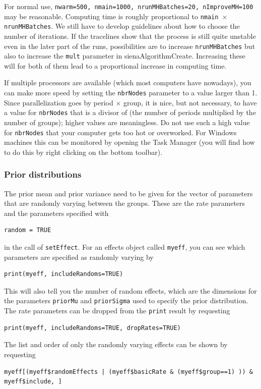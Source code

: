\documentclass[a4paper,fleqn,11pt]{article}
\newcommand{\+}{\, + \,}
\newcommand{\sfn}[1]{\textsf{#1}}
\begin{document}
For normal use, \texttt{nwarm=500, nmain=1000, nrunMHBatches=20, nImproveMH=100}
may be reasonable.
Computing time is roughly proportional to
\texttt{nmain $\times$ nrunMHBatches}.
We still have to develop guidelines about how to choose the number of
iterations. If the tracelines show that the process is still quite
unstable even in the later part of the runs, possibilities are to
increase \texttt{nrunMHBatches} but also to increase the \texttt{mult} parameter in
\sfn{sienaAlgorithmCreate}. Increasing these will for both of them lead to
a proportional increase in computing time.

If multiple processors are available (which most computers have nowadays),
you can make more speed by setting the \texttt{nbrNodes} parameter to a value
larger than 1. Since parallelization goes by period $\times$ group,
it is nice, but not necessary, to have a value for \texttt{nbrNodes} that
is a divisor of (the number of periods multiplied by the number of groups);
higher values are meaningless.
Do not use such a high value for \texttt{nbrNodes} that your computer gets too
 hot or overworked. For Windows machines this can be monitored by opening
 the Task Manager (you will find how to do this by right clicking on the bottom
 toolbar).

\subsubsection{Prior distributions}

The prior mean and prior variance need to be given for the vector of parameters
that are randomly varying between the groups.
These are the rate parameters and the parameters specified with
\begin{verbatim}
random = TRUE
\end{verbatim}
in the call of \texttt{setEffect}.
For an effects object called \texttt{myeff}, you can see which
parameters are specified as randomly varying by
\begin{verbatim}
print(myeff, includeRandoms=TRUE)
\end{verbatim}
This will also tell you the number of random effects, which are the
dimensions for the parameters \texttt{priorMu} and  \texttt{priorSigma}
used to specify the prior distribution.
The rate parameters can be dropped from the \texttt{print} result
by requesting
\begin{verbatim}
print(myeff, includeRandoms=TRUE, dropRates=TRUE)
\end{verbatim}
The list and order of only the randomly varying effects
can be shown by requesting
{\small
\begin{verbatim}
myeff[(myeff$randomEffects | (myeff$basicRate & (myeff$group==1) )) & myeff$include, ]
\end{verbatim}
}
\end{document}
